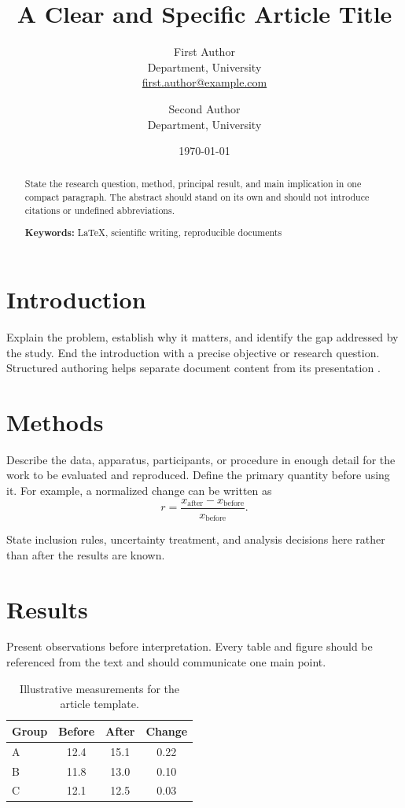 \documentclass[11pt,a4paper]{article}
\title{A Clear and Specific Article Title}
\author{
  First Author\\
  \small Department, University\\
  \small \href{mailto:first.author@example.com}{first.author@example.com}
  \and
  Second Author\\
  \small Department, University
}
\date{\today}
\newcommand{\keywords}[1]{%
  \par\smallskip
  \noindent\textbf{Keywords:} #1
}
\begin{document}
\maketitle

\begin{abstract}
State the research question, method, principal result, and main implication in
one compact paragraph. The abstract should stand on its own and should not
introduce citations or undefined abbreviations.
\keywords{LaTeX, scientific writing, reproducible documents}
\end{abstract}

\section{Introduction}

Explain the problem, establish why it matters, and identify the gap addressed
by the study. End the introduction with a precise objective or research
question. Structured authoring helps separate document content from its
presentation \parencite{lamport1994latex}.

\section{Methods}

Describe the data, apparatus, participants, or procedure in enough detail for
the work to be evaluated and reproduced. Define the primary quantity before
using it. For example, a normalized change can be written as
\begin{equation}
  r = \frac{x_{\mathrm{after}}-x_{\mathrm{before}}}{x_{\mathrm{before}}}.
  \label{eq:normalized-change}
\end{equation}

State inclusion rules, uncertainty treatment, and analysis decisions here
rather than after the results are known.

\section{Results}

Present observations before interpretation. Every table and figure should be
referenced from the text and should communicate one main point.

\begin{table}[htbp]
  \centering
  \caption{Illustrative measurements for the article template.}
  \label{tab:results}
  \begin{tabular}{@{}l S[table-format=2.1] S[table-format=2.1] S[table-format=1.2]@{}}
    \toprule
    Group & {Before} & {After} & {Change} \\
    \midrule
    A & 12.4 & 15.1 & 0.22 \\
    B & 11.8 & 13.0 & 0.10 \\
    C & 12.1 & 12.5 & 0.03 \\
    \bottomrule
  \end{tabular}
\end{table}
\end{document}
